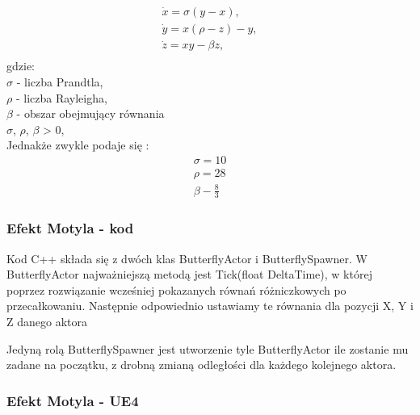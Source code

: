 \documentclass[a4paper,12pt,reqno]{article}
\begin{document}
\begin{equation}
\begin{split}
\dot{x}=\sigma(y-x),\\
\dot{y}=x(\rho-z)-y,\\
\dot{z}=xy-\beta z,\\
\end{split}
\end{equation}
gdzie:\\
$\sigma$ - liczba Prandtla,\\
$\rho$ - liczba Rayleigha,\\
$\beta$ - obszar obejmujący równania\\
$\sigma$, $\rho$, $\beta$ > 0,\\
Jednakże zwykle podaje się \cite{lorenz_dziwne_atraktory}:\\
\begin{equation}
\begin{split}
\sigma = 10\\
\rho = 28\\
\beta - \frac{8}{3}
\end{split}
\label{ButterflyVariables}
\end{equation}

\subsubsection{Efekt Motyla - kod}

Kod C++ składa się z dwóch klas ButterflyActor i ButterflySpawner.
W ButterflyActor najważniejszą metodą jest Tick(float DeltaTime), w której poprzez rozwiązanie wcześniej pokazanych równań różniczkowych po przecałkowaniu. Następnie odpowiednio ustawiamy te równania dla pozycji X, Y i Z danego aktora \cite{motyle_cpp}



Jedyną rolą ButterflySpawner jest utworzenie tyle ButterflyActor ile zostanie mu zadane na początku, z drobną zmianą odległości dla każdego kolejnego aktora.




\subsubsection{Efekt Motyla - UE4}
\end{document}
